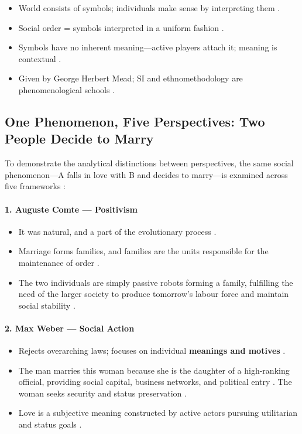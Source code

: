 \begin{QuickRevision}
\begin{itemize}
    \item World consists of symbols; individuals make sense by interpreting them .
    \item Social order = symbols interpreted in a uniform fashion .
    \item Symbols have no inherent meaning---active players attach it; meaning is contextual .
    \item Given by George Herbert Mead; SI and ethnomethodology are phenomenological schools .
\end{itemize}
\end{QuickRevision}

\subsection{One Phenomenon, Five Perspectives: Two People Decide to Marry}
To demonstrate the analytical distinctions between perspectives, the same social phenomenon---A falls in love with B and decides to marry---is examined across five frameworks :

\paragraph{1. Auguste Comte --- Positivism}
\begin{itemize}
    \item It was natural, and a part of the evolutionary process .
    \item Marriage forms families, and families are the units responsible for the maintenance of order .
    \item The two individuals are simply passive robots forming a family, fulfilling the need of the larger society to produce tomorrow's labour force and maintain social stability .
\end{itemize}

\paragraph{2. Max Weber --- Social Action}
\begin{itemize}
    \item Rejects overarching laws; focuses on individual \textbf{meanings and motives} .
    \item The man marries this woman because she is the daughter of a high-ranking official, providing social capital, business networks, and political entry . The woman seeks security and status preservation .
    \item Love is a subjective meaning constructed by active actors pursuing utilitarian and status goals .
\end{itemize}

